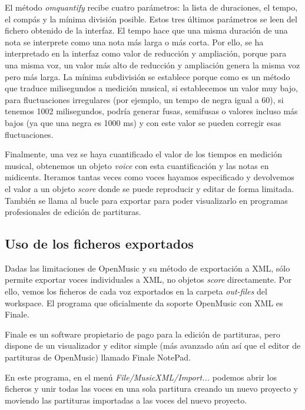 \documentclass[a4paper,openany,oneside,12pt]{book}
\begin{document}
El método \emph{omquantify} recibe cuatro parámetros: la lista de duraciones, el tempo, el compás y la mínima división posible. Estos tres últimos parámetros se leen del fichero obtenido de la interfaz. El tempo hace que una misma duración de una nota se interprete como una nota más larga o más corta. Por ello, se ha interpretado en la interfaz como valor de reducción y ampliación, porque para una misma voz, un valor más alto de reducción y ampliación genera la misma voz pero más larga. La mínima subdivisión se establece porque como es un método que traduce milisegundos a medición musical, si establecemos un valor muy bajo, para fluctuaciones irregulares (por ejemplo, un tempo de negra igual a 60), si tenemos 1002 milisegundos, podría generar fusas, semifusas o valores incluso más bajos (ya que una negra es 1000 ms) y con este valor se pueden corregir esas fluctuaciones.

Finalmente, una vez se haya cuantificado el valor de los tiempos en medición musical, obtenemos un objeto \emph{voice} con esta cuantificación y las notas en midicents. Iteramos tantas veces como voces hayamos especificado y devolvemos el valor a un objeto \emph{score} donde se puede reproducir y editar de forma limitada. También se llama al bucle para exportar para poder visualizarlo en programas profesionales de edición de partituras.


\subsection{Uso de los ficheros exportados}
Dadas las limitaciones de OpenMusic y su método de exportación a XML, sólo permite exportar voces individuales a XML, no objetos \emph{score} directamente. Por ello, vemos los ficheros de cada voz exportados en la carpeta \emph{out-files} del workspace. El programa que oficialmente da soporte OpenMusic con XML es Finale. 

Finale es un software propietario de pago para la edición de partituras, pero dispone de un visualizador y editor simple (más avanzado aún así que el editor de partituras de OpenMusic) llamado Finale NotePad. 

En este programa, en el menú \emph{File/MusicXML/Import...} podemos abrir los ficheros y unir todas las voces en una sola partitura creando un nuevo proyecto y moviendo las partituras importadas a las voces del nuevo proyecto.
\end{document}
